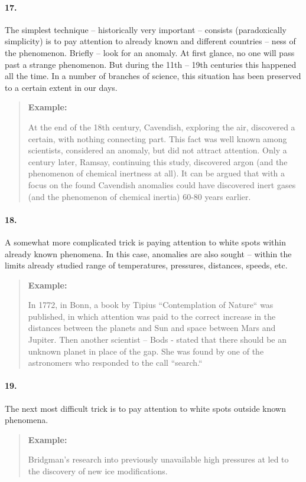 \documentclass[11pt,a4paper]{article}
\newenvironment{example}{\begin{quote} \textbf{Example:}\par }{\end{quote}}
\begin{document}
\paragraph{17.}
The simplest technique -- historically very important -- consists
(paradoxically simplicity) is to pay attention to already known and different
countries -- ness of the phenomenon. Briefly -- look for an anomaly. At first
glance, no one will pass past a strange phenomenon. But during the 11th --
19th centuries this happened all the time.  In a number of branches of
science, this situation has been preserved to a certain extent in our days.

\begin{example}
  At the end of the 18th century, Cavendish, exploring the air, discovered a
  certain, with nothing connecting part. This fact was well known among
  scientists, considered an anomaly, but did not attract attention. Only a
  century later, Ramsay, continuing this study, discovered argon (and the
  phenomenon of chemical inertness at all). It can be argued that with a focus
  on the found Cavendish anomalies could have discovered inert gases (and the
  phenomenon of chemical inertia) 60-80 years earlier.
\end{example}
\paragraph{18.}
A somewhat more complicated trick is paying attention to white spots within
already known phenomena. In this case, anomalies are also sought -- within the
limits already studied range of temperatures, pressures, distances, speeds,
etc.

\begin{example}
  In 1772, in Bonn, a book by Tipius “Contemplation of Nature“ was published,
  in which attention was paid to the correct increase in the distances between
  the planets and Sun and space between Mars and Jupiter. Then another
  scientist -- Bods - stated that there should be an unknown planet in place
  of the gap. She was found by one of the astronomers who responded to the
  call “search.“
\end{example}
\paragraph{19.}
The next most difficult trick is to pay attention to white spots outside known
phenomena.

\begin{example}
  Bridgman's research into previously unavailable high pressures at led to the
  discovery of new ice modifications.
\end{example}
\end{document}
